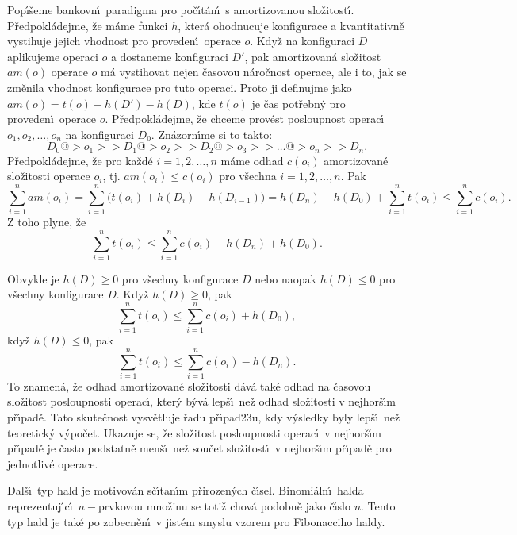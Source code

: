 \documentclass[a4paper,12pt]{article}
\begin{document}
\flushpar Pop\'\i\v seme bankovn\'\i\ paradigma pro po\v c\'\i t\'an\'\i\ s 
amortizovanou slo\v zitost\'\i . P\v redpokl\'adejme, \v ze m\'ame funkci $
h$, 
kter\'a ohodnucuje konfigurace a kvantitativn\v e vystihuje 
jejich vhodnost pro proveden\'\i\ operace $o$. 
Kdy\v z na konfiguraci $D$ aplikujeme operaci $o$ 
a dostaneme konfiguraci $D'$, pak amortizovan\'a slo\v zitost 
$am(o)$ ope\-race $o$ m\'a vystihovat nejen \v casovou n\'aro\v cnost 
operace, ale i to, jak se zm\v enila vhodnost konfigurace pro 
tuto operaci. Proto ji defi\-nujme jako $am(o)=t(o)+h(D')-h(D)$, kde $
t(o)$ je 
\v cas pot\v rebn\'y pro proveden\'\i\ operace $o$. P\v redpokl\'adejme, 
\v ze chceme prov\'est posloupnost operac\'\i\ $o_1,o_2,\dots,o_n$ na 
konfiguraci $D_0$. Zn\'azorn\'\i me si to takto:
$$D_0@>{o_1}>>D_1@>{o_2}>>D_2@>{o_3}>>\dots@>{o_n}>>D_n.$$
P\v redpokl\'adejme, \v ze pro ka\v zd\'e $i=1,2,\dots,n$ m\'ame odhad 
$c(o_i)$ amortizovan\'e slo\v zitos\-ti operace $o_i$, tj. $am(o_
i)\le c(o_i)$ 
pro v\v sechna $i=1,2,\dots,n$. Pak
$$\sum_{i=1}^nam(o_i)=\sum_{i=1}^n\big(t(o_i)+h(D_i)-h(D_{i-1})\big
)=h(D_n)-h(D_0)+\sum_{i=1}^nt(o_i)\le\sum_{i=1}^nc(o_i).$$
Z toho plyne, \v ze 
$$\sum_{i=1}^nt(o_i)\le\sum_{i=1}^nc(o_i)-h(D_n)+h(D_0).$$
\medskip

\flushpar Obvykle je $h(D)\ge 0$ pro v\v sechny konfigurace $D$ 
nebo naopak $h(D)\le 0$ 
pro v\v sechny konfigurace $D$. Kdy\v z $h(D)\ge 0$, pak 
$$\sum_{i=1}^nt(o_i)\le\sum_{i=1}^nc(o_i)+h(D_0),$$
kdy\v z $h(D)\le 0$, pak 
$$\sum_{i=1}^nt(o_i)\le\sum_{i=1}^nc(o_i)-h(D_n).$$
To znamen\'a, \v ze odhad amortizovan\'e slo\v zitosti d\'av\'a tak\'e odhad 
na \v casovou slo\v zitost posloupnosti operac\'\i , kter\'y b\'yv\'a lep\v s\'\i\ ne\v z odhad slo\v zitosti v 
nejhor\v s\'\i m p\v r\'\i pad\v e.  Tato skute\v cnost vysv\v etluje \v radu 
p\v r\'\i pad\accent23u, kdy 
v\'ysledky byly lep\v s\'\i\ ne\v z teoretick\'y v\'ypo\v cet.  Ukazuje se, \v ze 
slo\v zitost posloupnosti operac\'\i\ v nejhor\v s\'\i m p\v r\'\i pad\v e je \v casto podstatn\v e 
men\v s\'\i\ ne\v z sou\v cet slo\v zitost\'\i\ v nejhor\v s\'\i m p\v r\'\i pad\v e pro 
jednotliv\'e operace.  
\bigskip

\centerline{}
\medskip

\flushpar Dal\v s\'\i\ typ hald je motivov\'an s\v c\'\i tan\'\i m p\v rirozen\'ych \v c\'\i sel.  
Binomi\'aln\'\i\ halda reprezentuj\'\i c\'\i\ $n-$prvkovou mno\v zinu se 
toti\v z chov\'a 
podobn\v e jako \v c\'\i slo $n$.  Tento typ hald je tak\'e po zobecn\v en\'\i\ v jist\'em 
smyslu vzorem pro Fibonacciho haldy.  
\medskip
\end{document}
